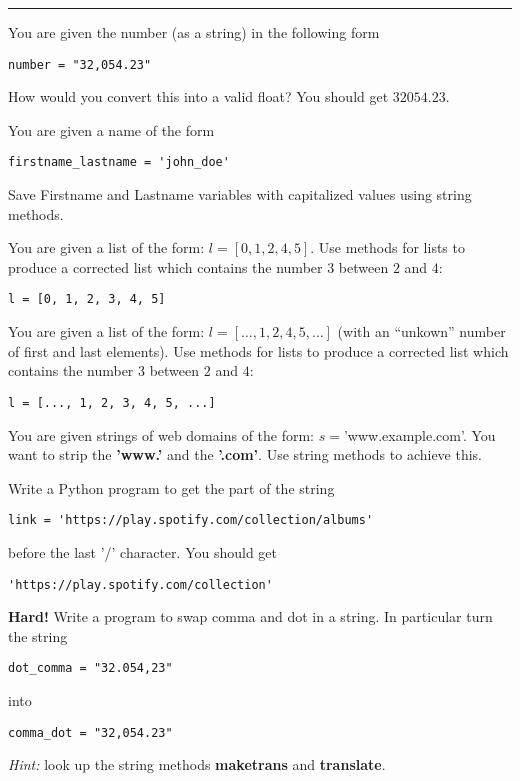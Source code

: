 \begin{questions}
\begin{center}
\noindent\rule{10cm}{0.4pt}
\end{center}

\pagebreak

\item You are given the number (as a string) in the following form
\begin{verbatim}
number = "32,054.23"
\end{verbatim}
How would you convert this into a valid float? You should get $32054.23$.


\item You are given a name of the form
\begin{verbatim}
firstname_lastname = 'john_doe'
\end{verbatim}
Save Firstname and Lastname variables with capitalized values using string methods.

\item You are given a list of the form: $l = [0, 1, 2, 4, 5]$. Use methods for lists to produce a corrected list which contains the number $3$ between $2$ and $4$:

\begin{verbatim}
l = [0, 1, 2, 3, 4, 5]
\end{verbatim}

\item You are given a list of the form: $l = [\dots, 1, 2, 4, 5, \dots]$ (with an ``unkown'' number of first and last elements). Use methods for lists to produce a corrected list which contains the number $3$ between $2$ and $4$:

\begin{verbatim}
l = [..., 1, 2, 3, 4, 5, ...]
\end{verbatim}

\item You are given strings of web domains of the form: $s = $'www.example.com'. You want to strip the \textbf{'www.'} and the \textbf{'.com'}. Use string methods to achieve this.

\item Write a Python program to get the part of the string
\begin{verbatim}
link = 'https://play.spotify.com/collection/albums'
\end{verbatim}
before the last '/' character. You should get \begin{verbatim}
'https://play.spotify.com/collection'
\end{verbatim}


\item \textbf{Hard!} Write a program to swap comma and dot in a string. In particular turn the string
\begin{verbatim}
dot_comma = "32.054,23"
\end{verbatim}
into
\begin{verbatim}
comma_dot = "32,054.23"
\end{verbatim}
\emph{Hint:} look up the string methods \textbf{maketrans} and \textbf{translate}.
\end{questions}

%



